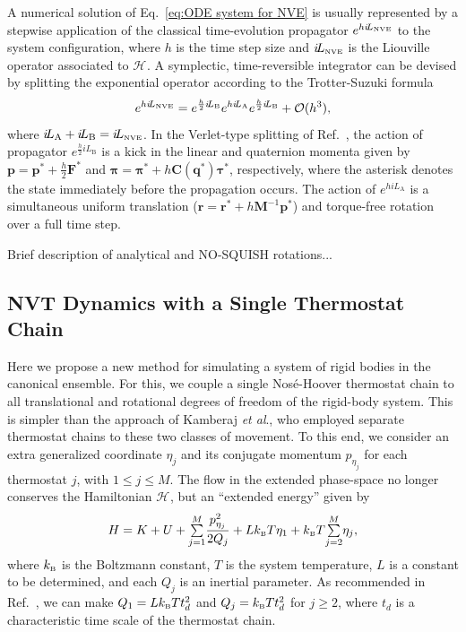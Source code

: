 \documentclass[
journal=jctcce,
layout=twocolumn
]{achemso}
\newcommand{\mt}[1]{\boldsymbol{\mathbf{#1}}}   %
\newcommand{\vt}[1]{\boldsymbol{\mathbf{#1}}}   %
\newcommand{\Ham}[1]{{\mathcal H}_\text{#1}}    %
\newcommand{\Liu}[1]{i\!L_\text{#1}}            %
\newcommand{\timestep}{h}
\begin{document}
A numerical solution of Eq.~\eqref{eq:ODE system for NVE} is usually represented by a stepwise application of the classical time-evolution propagator \cite{Tuckerman_2010} $e^{\timestep \Liu{\tiny NVE}}$ to the system configuration, where $\timestep$ is the time step size and $\Liu{\tiny NVE}$ is the Liouville operator associated to $\Ham{}$.
A symplectic, time-reversible integrator can be devised by splitting the exponential operator according to the Trotter-Suzuki formula \cite{Trotter_1959, Suzuki_1976}
\begin{equation}
\label{eq:splitting NVE}
e^{\timestep \Liu{\tiny NVE}} = e^{\frac{\timestep}{2} \Liu{B}} e^{\timestep \Liu{A}} e^{\frac{\timestep}{2} \Liu{B}} + \mathcal{O}(\timestep^3),
\end{equation}
where $\Liu{A} + \Liu{B} = \Liu{\tiny NVE}$.
In the Verlet-type splitting of Ref.~, the action of propagator $e^{\frac{\timestep}{2} \Liu{B}}$ is a kick in the linear and quaternion momenta given by ${\vt p} = {\vt p}^\ast + \frac{\timestep}{2} {\vt F}^\ast$ and ${\vt \pi} = {\vt \pi}^\ast + \timestep {\mt C}({\vt q^\ast}) {\vt \tau}^\ast$, respectively, where the asterisk denotes the state immediately before the propagation occurs.
The action of $e^{\timestep \Liu{A}}$ is a simultaneous uniform translation (${\vt r} = {\vt r}^\ast + \timestep {\mt M}^{-1} {\vt p}^\ast$) and torque-free rotation over a full time step.

Brief description of analytical and NO-SQUISH rotations...

\subsection{NVT Dynamics with a Single Thermostat Chain}

Here we propose a new method for simulating a system of rigid bodies in the canonical ensemble.
For this, we couple a single Nos\'{e}-Hoover thermostat chain \cite{Martyna_1992} to all translational and rotational degrees of freedom of the rigid-body system.
This is simpler than the approach of Kamberaj \textit{et al}.,\cite{Kamberaj_2005} who employed separate thermostat chains to these two classes of movement.
To this end, we consider an extra generalized coordinate $\eta_j$ and its conjugate momentum $p_{\eta_j}$ for each thermostat $j$, with $1 \leq j \le M$.
The flow in the extended phase-space no longer conserves the Hamiltonian $\Ham{}$, but an ``extended energy'' given by \cite{Martyna_1992}
\begin{equation}
\label{eq:nvt extended energy}
H = K + U + {\textstyle\sum\limits_{j=1}^{M}} \frac{p_{\eta_j}^2}{2Q_j} + L k_\text{\tiny B} T\eta_1 + k_\text{\tiny B} T {\textstyle\sum\limits_{j=2}^{M}} \eta_j,
\end{equation}
where $k_\text{\tiny B}$ is the Boltzmann constant, $T$ is the system temperature, $L$ is a constant to be determined, and each $Q_j$ is an inertial parameter.
As recommended in Ref.~, we can make $Q_1 = L k_\text{\tiny B} T t_d^2$ and $Q_j = k_\text{\tiny B} T t_d^2$ for $j \geq 2$, where $t_d$ is a characteristic time scale of the thermostat chain.
\end{document}
